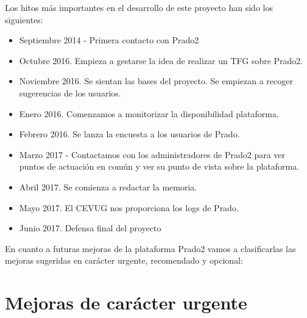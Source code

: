 Los hitos más importantes en el desarrollo de este proyecto han sido los siguientes:

\begin{itemize}
	\item Septiembre 2014 - Primera contacto con Prado2

    \item Octubre 2016. Empieza a gestarse la idea de realizar un TFG sobre Prado2.
    
    \item Noviembre 2016. Se sientan las bases del proyecto. Se empiezan a recoger sugerencias de los usuarios.
    
    \item Enero 2016. Comenzamos a monitorizar la disponibilidad plataforma.
    
    \item Febrero 2016. Se lanza la encuesta a los usuarios de Prado.
    
    \item Marzo 2017 - Contactamos con los administradores de Prado2 para ver puntos de actuación en común y ver su punto de vista sobre la plataforma.
    
    \item Abril 2017. Se comienza a redactar la memoria.

    \item Mayo 2017. El CEVUG nos proporciona los logs de Prado.
    
    \item Junio 2017. Defensa final del proyecto

\end{itemize}




\newpage
En cuanto a futuras mejoras de la plataforma Prado2 vamos a clasificarlas las mejoras sugeridas en carácter urgente, recomendado y opcional:

\section{Mejoras de carácter urgente}

